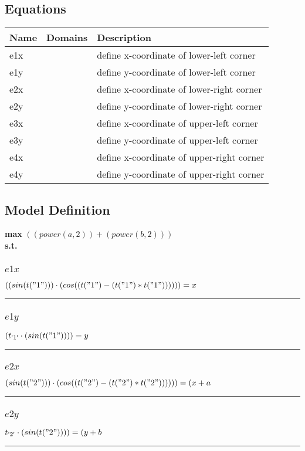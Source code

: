 \documentclass[11pt]{article}
\begin{document}
\subsection*{Equations}
\begin{tabularx}{\textwidth}{| l | l | X |}
\hline
\textbf{Name} & \textbf{Domains} & \textbf{Description}\\
\hline
\endhead

e1x &  & define x-coordinate of lower-left corner\\
e1y &  & define y-coordinate of lower-left corner\\
e2x &  & define x-coordinate of lower-right corner\\
e2y &  & define y-coordinate of lower-right corner\\
e3x &  & define x-coordinate of upper-left corner\\
e3y &  & define y-coordinate of upper-left corner\\
e4x &  & define x-coordinate of upper-right corner\\
e4y &  & define y-coordinate of upper-right corner\\
\hline
\end{tabularx}
\subsection*{Model Definition}
\textbf{max} $(( power(a,2) ) + ( power(b,2) ))$\\
\textbf{s.t.}
\subsubsection*{$e1x$}
$
(( sin(t("1")) ) \cdot ( cos((t("1") - (t("1") * t("1")))) )) = x
$
\vspace{5pt}
\hrule
\subsubsection*{$e1y$}
$
(t_\text{\text{\textquotesingle 1\textquotesingle}} \cdot ( sin(t("1")) )) = y
$
\vspace{5pt}
\hrule
\subsubsection*{$e2x$}
$
( sin(t("2")) ) \cdot ( cos((t("2") - (t("2") * t("2")))) )) = (x + a
$
\vspace{5pt}
\hrule
\subsubsection*{$e2y$}
$
t_\text{\text{\textquotesingle 2\textquotesingle}} \cdot ( sin(t("2")) )) = (y + b
$
\vspace{5pt}
\hrule
\end{document}
